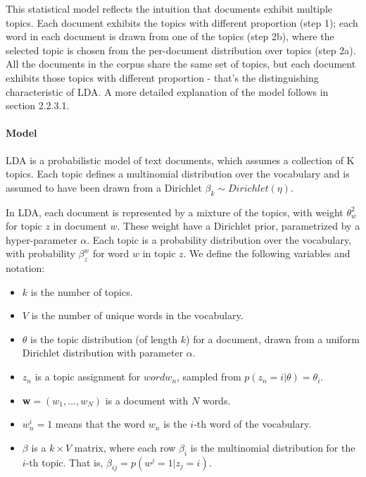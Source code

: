 \documentclass[12pt]{report}
\begin{document}
This statistical model reflects the intuition that documents exhibit multiple
topics. Each document exhibits the topics with different proportion (step 1);
each word in each document is drawn from one of the topics (step 2b), where the
selected topic is chosen from the per-document distribution over topics (step
2a). All the documents in the corpus share the same set of topics, but each
document exhibits those topics with different proportion - that's the
distinguishing characteristic of LDA. A more detailed explanation of the model
follows in section 2.2.3.1.

\paragraph{Model}

LDA is a probabilistic model of text documents, which assumes a collection of 
K topics. Each topic defines a multinomial distribution over the vocabulary 
and is assumed to have been drawn from a Dirichlet 
$\beta_k \sim Dirichlet(\eta)$.

In LDA, each document is represented by a mixture of the topics, with weight
$\theta_w^2$ for topic $z$ in document $w$. These weight have a Dirichlet prior,
parametrized by a hyper-parameter $\alpha$. Each topic is a probability
distribution over the vocabulary, with probability $\beta^w_z$ for word $w$ in
topic $z$. We define the following variables and notation:
\begin{itemize}
  \item[] $k$ is the number of topics.
  \item[] $V$ is the number of unique words in the vocabulary.
  \item[] $\theta$  is the topic distribution (of length $k$) for a document,
   drawn from a uniform Dirichlet distribution with parameter $\alpha$.
  \item[] $z_{n}$ is a topic assignment for $word w_{n}$, sampled from 
  $p(z_{n} = i|\theta) = \theta_{i}$.
  \item[] \textbf{w}$ = (w_{1}, ... , w_{N})$ is a document with $N$ words.
  \item[] $w_{n}^{i} = 1$ means that the word $w_{n}$ is the $i$-th word 
  of the vocabulary.
  \item[] $\beta$  is a $k \times V$ matrix, where each row $\beta_{i}$ 
  is the multinomial distribution for the $i$-th topic. That is, 
  $\beta_{ij} = p(w^{j} = 1 | z_{j} = i)$.
\end{itemize}
\end{document}
